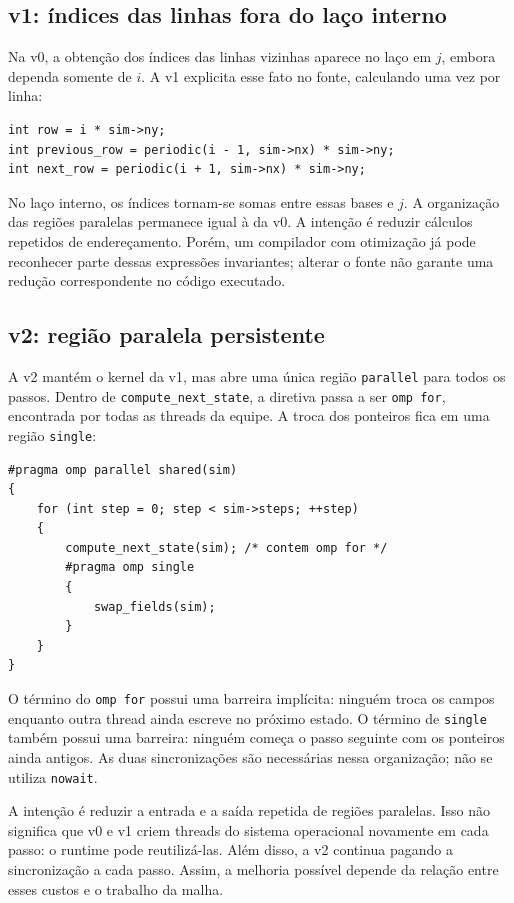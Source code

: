 \documentclass[12pt,a4paper]{article}
\begin{document}
\subsection{v1: índices das linhas fora do laço interno}
Na v0, a obtenção dos índices das linhas vizinhas aparece no laço em $j$, embora dependa somente de $i$. A v1 explicita esse fato no fonte, calculando uma vez por linha:
\begin{lstlisting}[style=CStyle]
int row = i * sim->ny;
int previous_row = periodic(i - 1, sim->nx) * sim->ny;
int next_row = periodic(i + 1, sim->nx) * sim->ny;
\end{lstlisting}
No laço interno, os índices tornam-se somas entre essas bases e $j$. A organização das regiões paralelas permanece igual à da v0. A intenção é reduzir cálculos repetidos de endereçamento. Porém, um compilador com otimização já pode reconhecer parte dessas expressões invariantes; alterar o fonte não garante uma redução correspondente no código executado.

\subsection{v2: região paralela persistente}
A v2 mantém o kernel da v1, mas abre uma única região \texttt{parallel} para todos os passos. Dentro de \texttt{compute\_next\_state}, a diretiva passa a ser \texttt{omp for}, encontrada por todas as threads da equipe. A troca dos ponteiros fica em uma região \texttt{single}:
\begin{lstlisting}[style=CStyle]
#pragma omp parallel shared(sim)
{
    for (int step = 0; step < sim->steps; ++step)
    {
        compute_next_state(sim); /* contem omp for */
        #pragma omp single
        {
            swap_fields(sim);
        }
    }
}
\end{lstlisting}

O término do \texttt{omp for} possui uma barreira implícita: ninguém troca os campos enquanto outra thread ainda escreve no próximo estado. O término de \texttt{single} também possui uma barreira: ninguém começa o passo seguinte com os ponteiros ainda antigos. As duas sincronizações são necessárias nessa organização; não se utiliza \texttt{nowait}.



A intenção é reduzir a entrada e a saída repetida de regiões paralelas. Isso não significa que v0 e v1 criem threads do sistema operacional novamente em cada passo: o runtime pode reutilizá-las. Além disso, a v2 continua pagando a sincronização a cada passo. Assim, a melhoria possível depende da relação entre esses custos e o trabalho da malha.
\end{document}
